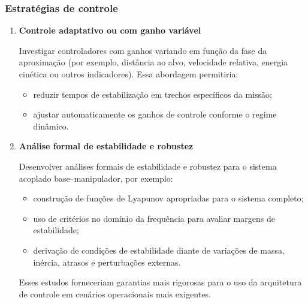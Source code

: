 \subsubsection{Estratégias de controle}

\begin{enumerate}[label=(\alph*),resume]

    \item \textbf{Controle adaptativo ou com ganho variável}

    Investigar controladores com ganhos variando em função da fase da aproximação (por exemplo, distância ao alvo, velocidade relativa, energia cinética ou outros indicadores).
    Essa abordagem permitiria:
    \begin{itemize}
        \item reduzir tempos de estabilização em trechos específicos da missão;
        \item ajustar automaticamente os ganhos de controle conforme o regime dinâmico.
    \end{itemize}

    \item \textbf{Análise formal de estabilidade e robustez}

    Desenvolver análises formais de estabilidade e robustez para o sistema acoplado base--manipulador, por exemplo:
    \begin{itemize}
        \item construção de funções de Lyapunov apropriadas para o sistema completo;
        \item uso de critérios no domínio da frequência para avaliar margens de estabilidade;
        \item derivação de condições de estabilidade diante de variações de massa, inércia, atrasos e perturbações externas.
    \end{itemize}
    Esses estudos forneceriam garantias mais rigorosas para o uso da arquitetura de controle em cenários operacionais mais exigentes.

\end{enumerate}
